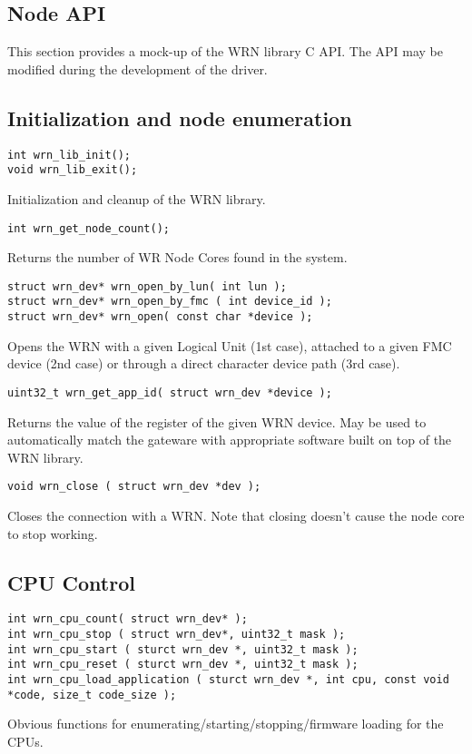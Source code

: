 \documentclass{article}
\begin{document}
\subsection{Node API}

This section provides a mock-up of the WRN library C API. The API may be modified during the development of the driver.

\subsection{Initialization and node enumeration}

\begin{verbatim}
int wrn_lib_init();
void wrn_lib_exit();
\end{verbatim}
Initialization and cleanup of the WRN library.

\begin{verbatim}
int wrn_get_node_count();
\end{verbatim}
Returns the number of WR Node Cores found in the system.

\begin{verbatim}
struct wrn_dev* wrn_open_by_lun( int lun );
struct wrn_dev* wrn_open_by_fmc ( int device_id );
struct wrn_dev* wrn_open( const char *device );
\end{verbatim}
Opens the WRN with a given Logical Unit (1st case), attached to a given FMC device (2nd case) or through a direct character device path (3rd case).

\begin{verbatim}
uint32_t wrn_get_app_id( struct wrn_dev *device );
\end{verbatim}
Returns the value of the  register of the given WRN device. May be used to 
automatically match the gateware with appropriate software built on top of the WRN library.

\begin{verbatim}
void wrn_close ( struct wrn_dev *dev );
\end{verbatim}
Closes the connection with a WRN. Note that closing doesn't cause the node core to stop working.

\subsection{CPU Control}

\begin{verbatim}
int wrn_cpu_count( struct wrn_dev* );
int wrn_cpu_stop ( struct wrn_dev*, uint32_t mask );
int wrn_cpu_start ( sturct wrn_dev *, uint32_t mask );
int wrn_cpu_reset ( sturct wrn_dev *, uint32_t mask );
int wrn_cpu_load_application ( sturct wrn_dev *, int cpu, const void *code, size_t code_size );
\end{verbatim}
Obvious functions for enumerating/starting/stopping/firmware loading for the CPUs.
\end{document}
